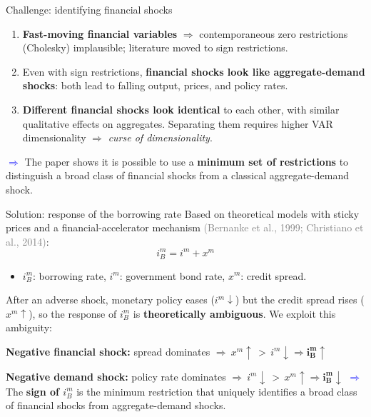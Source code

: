 \documentclass[10pt]{beamer}
\begin{document}
\begin{frame}{Challenge: identifying financial shocks}
\begin{enumerate}
    \item \textbf{Fast-moving financial variables} $\Rightarrow$ contemporaneous zero restrictions (Cholesky) implausible; literature moved to sign restrictions.
    \vspace{0.4em}
    \item Even with sign restrictions, \textbf{financial shocks look like aggregate-demand shocks}: both lead to falling output, prices, and policy rates.
    \vspace{0.4em}
    \item \textbf{Different financial shocks look identical} to each other, with similar qualitative effects on aggregates. Separating them requires higher VAR dimensionality $\Rightarrow$ \emph{curse of dimensionality}.
\end{enumerate}
\pause
\vspace{0.6em}
\textcolor{blue}{$\boldsymbol{\Rightarrow}$} The paper shows it is possible to use a \textbf{minimum set of restrictions} to distinguish a broad class of financial shocks from a classical aggregate-demand shock.
\end{frame}


\begin{frame}{Solution: response of the borrowing rate}
Based on theoretical models with sticky prices and a financial-accelerator mechanism \textcolor{gray}{\scriptsize(Bernanke et al., 1999; Christiano et al., 2014)}:
\begin{equation*}
i_B^m = i^m + x^m
\end{equation*}
\vspace{-0.3em}
\begin{itemize}\scriptsize
    \item $i_B^m$: borrowing rate, $i^m$: government bond rate, $x^m$: credit spread.
\end{itemize}
\vspace{0.3em}
\pause
After an adverse shock, monetary policy eases ($i^m \downarrow$) but the credit spread rises ($x^m \uparrow$), so the response of $i_B^m$ is \textbf{theoretically ambiguous}. We exploit this ambiguity:
\vspace{0.5em}

\textbf{Negative financial shock:} \quad spread dominates $\Rightarrow\ x^m\!\uparrow\, >\, i^m\!\downarrow \Rightarrow \boldsymbol{i_B^m \uparrow}$

\textbf{Negative demand shock:} \quad policy rate dominates $\Rightarrow\ i^m\!\downarrow\, >\, x^m\!\uparrow \Rightarrow \boldsymbol{i_B^m \downarrow}$
\vspace{0.5em}
\pause
\textcolor{blue}{$\boldsymbol{\Rightarrow}$} The \textbf{sign of $i_B^m$} is the minimum restriction that uniquely identifies a broad class of financial shocks from aggregate-demand shocks.
\end{frame}
\end{document}
